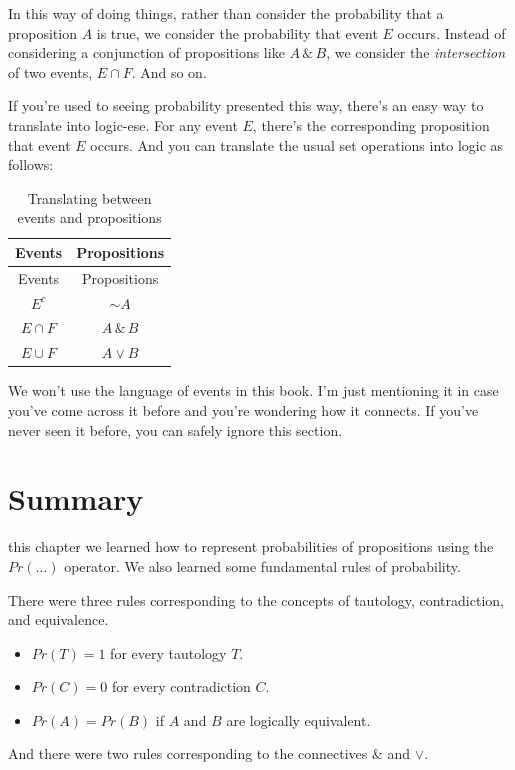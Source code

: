 \documentclass[justified]{tufte-book}
\providecommand{\tightlist}{%
  \setlength{\itemsep}{0pt}\setlength{\parskip}{0pt}}
\renewcommand{\wedge}{\mathbin{\&}}
\newcommand{\p}{Pr}
\theoremstyle{definition}
\theoremstyle{definition}
\theoremstyle{definition}
\theoremstyle{remark}
\begin{document}
In this way of doing things, rather than consider the probability that a
proposition \(A\) is true, we consider the probability that event \(E\)
occurs. Instead of considering a conjunction of propositions like
\(A \,\&\, B\), we consider the \emph{intersection} of two events,
\(E \cap F\). And so on.

If you're used to seeing probability presented this way, there's an easy
way to translate into logic-ese. For any event \(E\), there's the
corresponding proposition that event \(E\) occurs. And you can translate
the usual set operations into logic as follows:

\begin{longtable}[]{@{}cc@{}}
\caption{\label{tab:unnamed-chunk-60}Translating between events and
propositions}\tabularnewline
\toprule
Events & Propositions\tabularnewline
\midrule
\endfirsthead
\toprule
Events & Propositions\tabularnewline
\midrule
\endhead
\(E^c\) & \(\sim\! A\)\tabularnewline
\(E \cap F\) & \(A \,\&\, B\)\tabularnewline
\(E \cup F\) & \(A \vee B\)\tabularnewline
\bottomrule
\end{longtable}

We won't use the language of events in this book. I'm just mentioning it
in case you've come across it before and you're wondering how it
connects. If you've never seen it before, you can safely ignore this
section.

\hypertarget{summary-1}{%
\section{Summary}\label{summary-1}}

 this chapter we learned how to represent probabilities
of propositions using the \(Pr(\ldots)\) operator. We also learned some
fundamental rules of probability.

There were three rules corresponding to the concepts of tautology,
contradiction, and equivalence.

\begin{itemize}
\tightlist
\item
  \(\p(T) = 1\) for every tautology \(T\).
\item
  \(\p(C) = 0\) for every contradiction \(C\).
\item
  \(\p(A) = \p(B)\) if \(A\) and \(B\) are logically equivalent.
\end{itemize}

And there were two rules corresponding to the connectives \(\wedge\) and
\(\vee\).
\end{document}
